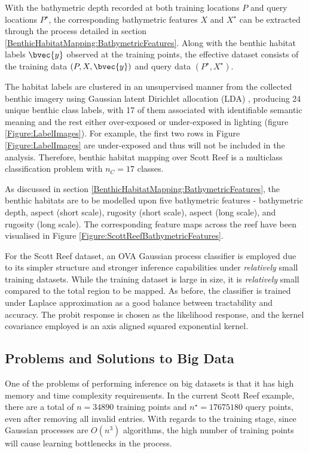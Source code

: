 		With the bathymetric depth recorded at both training locations $P$ and query locations $P^{\star}$, the corresponding bathymetric features $X$ and $X^{\star}$ can be extracted through the process detailed in section \ref{BenthicHabitatMapping:BathymetricFeatures}. Along with the benthic habitat labels $\bvec{y}$ observed at the training points, the effective dataset consists of the training data $(P, X, \bvec{y})$ and query data $(P^{\star}, X^{\star})$.

		The habitat labels are clustered in an unsupervised manner from the collected benthic imagery using Gaussian latent Dirichlet allocation (LDA) \citep{Steinberg2015128}, producing 24 unique benthic class labels, with 17 of them associated with identifiable semantic meaning and the rest either over-exposed or under-exposed in lighting (figure \ref{Figure:LabelImages}). For example, the first two rows in Figure \ref{Figure:LabelImages} are under-exposed and thus will not be included in the analysis. Therefore, benthic habitat mapping over Scott Reef is a multiclass classification problem with $n_{C} = 17$ classes.
		
		As discussed in section \ref{BenthicHabitatMapping:BathymetricFeatures}, the benthic habitats are to be modelled upon five bathymetric features - bathymetric depth, aspect (short scale), rugosity (short scale), aspect (long scale), and rugosity (long scale). The corresponding feature maps across the reef have been visualised in Figure \ref{Figure:ScottReefBathymetricFeatures}.
			
		For the Scott Reef dataset, an OVA Gaussian process classifier is employed due to its simpler structure and stronger inference capabilities under \textit{relatively} small training datasets. While the training dataset is large in size, it is \textit{relatively} small compared to the total region to be mapped. As before, the classifier is trained under Laplace approximation as a good balance between tractability and accuracy. The probit response is chosen as the likelihood response, and the kernel covariance employed is an axis aligned squared exponential kernel.
			
		\subsection{Problems and Solutions to Big Data}
		\label{BenthicHabitatMapping:ScottReef:BigData}
		
			One of the problems of performing inference on big datasets is that it has high memory and time complexity requirements. In the current Scott Reef example, there are a total of $n = 34890$ training points and $n^{\star} = 17675180$ query points, even after removing all invalid entries. With regards to the training stage, since Gaussian processes are $O(n^{3})$ algorithms, the high number of training points will cause learning bottlenecks in the process.
			
